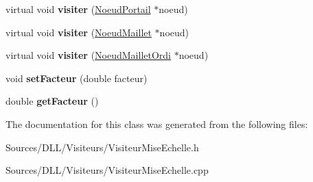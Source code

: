 \begin{DoxyCompactItemize}
\item 
virtual void {\bfseries visiter} (\hyperlink{class_noeud_portail}{Noeud\+Portail} $\ast$noeud)\hypertarget{class_visiteur_mise_echelle_ac7e9e70b4a1945774e5d4f45e6026d35}{}\label{class_visiteur_mise_echelle_ac7e9e70b4a1945774e5d4f45e6026d35}

\item 
virtual void {\bfseries visiter} (\hyperlink{class_noeud_maillet}{Noeud\+Maillet} $\ast$noeud)\hypertarget{class_visiteur_mise_echelle_a78e0184c3766891592b303a66539e0f2}{}\label{class_visiteur_mise_echelle_a78e0184c3766891592b303a66539e0f2}

\item 
virtual void {\bfseries visiter} (\hyperlink{class_noeud_maillet_ordi}{Noeud\+Maillet\+Ordi} $\ast$noeud)\hypertarget{class_visiteur_mise_echelle_a6bfd89cad505cd5ddd5195759b8703c2}{}\label{class_visiteur_mise_echelle_a6bfd89cad505cd5ddd5195759b8703c2}

\item 
void {\bfseries set\+Facteur} (double facteur)\hypertarget{class_visiteur_mise_echelle_ac151f94cc1244fcefe97a7f6d2b44a7a}{}\label{class_visiteur_mise_echelle_ac151f94cc1244fcefe97a7f6d2b44a7a}

\item 
double {\bfseries get\+Facteur} ()\hypertarget{class_visiteur_mise_echelle_a27fec16586133631a9caeb27a60b638e}{}\label{class_visiteur_mise_echelle_a27fec16586133631a9caeb27a60b638e}

\end{DoxyCompactItemize}


The documentation for this class was generated from the following files\+:\begin{DoxyCompactItemize}
\item 
Sources/\+D\+L\+L/\+Visiteurs/Visiteur\+Mise\+Echelle.\+h\item 
Sources/\+D\+L\+L/\+Visiteurs/Visiteur\+Mise\+Echelle.\+cpp\end{DoxyCompactItemize}
